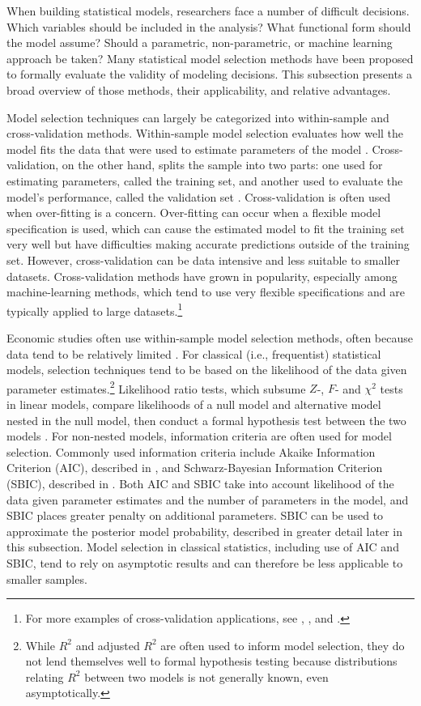 \documentclass[twocolumn]{article}
\begin{document}
When building statistical models, researchers face a number of difficult decisions. Which variables should be included in the analysis? What functional form should the model assume? Should a parametric, non-parametric, or machine learning approach be taken? Many statistical model selection methods have been proposed to formally evaluate the validity of modeling decisions. This subsection presents a broad overview of those methods, their applicability, and relative advantages.

Model selection techniques can largely be categorized into within-sample and cross-validation methods. Within-sample model selection evaluates how well the model fits the data that were used to estimate parameters of the model \citep{Greene}. Cross-validation, on the other hand, splits the sample into two parts: one used for estimating parameters, called the training set, and another used to evaluate the model's performance, called the validation set \citep{Arlot}. Cross-validation is often used when over-fitting is a concern. Over-fitting can occur when a flexible model specification is used, which can cause the estimated model to fit the training set very well but have difficulties making accurate predictions outside of the training set. However, cross-validation can be data intensive and less suitable to smaller datasets. Cross-validation methods have grown in popularity, especially among machine-learning methods, which tend to use very flexible specifications and are typically applied to large datasets.\footnote{For more examples of cross-validation applications, see \cite{Allen}, \cite{Golub}, and \cite{Kohavi}.}

Economic studies often use within-sample model selection methods, often because data tend to be relatively limited \citep{Greene}. For classical (i.e., frequentist) statistical models, selection techniques tend to be based on the likelihood of the data given parameter estimates.\footnote{While $R^2$ and adjusted $R^2$ are often used to inform model selection, they do not lend themselves well to formal hypothesis testing because distributions relating $R^2$ between two models is not generally known, even asymptotically.} Likelihood ratio tests, which subsume $Z$-, $F$- and $\chi^2$ tests in linear models, compare likelihoods of a null model and alternative model nested in the null model, then conduct a formal hypothesis test between the two models \citep{Morgan}. For non-nested models, information criteria are often used for model selection. Commonly used information criteria include Akaike Information Criterion (AIC), described in \cite{Akaike}, and Schwarz-Bayesian Information Criterion (SBIC), described in \cite{Schwarz}. Both AIC and SBIC take into account likelihood of the data given parameter estimates and the number of parameters in the model, and SBIC places greater penalty on additional parameters. SBIC can be used to approximate the posterior model probability, described in greater detail later in this subsection. Model selection in classical statistics, including use of AIC and SBIC, tend to rely on asymptotic results and can therefore be less applicable to smaller samples.
\end{document}

